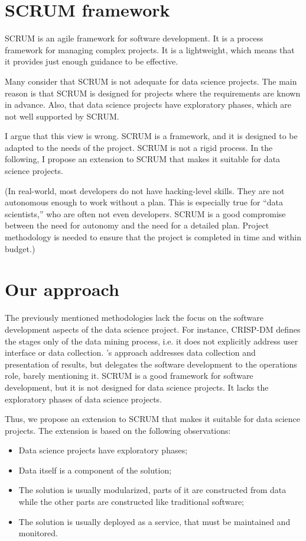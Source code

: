 \section{SCRUM framework}

SCRUM is an agile framework for software development.  It is a process framework for
managing complex projects.  It is a lightweight, which means that it
provides just enough guidance to be effective.

Many consider that SCRUM is not adequate for data science projects.  The main reason is
that SCRUM is designed for projects where the requirements are known in advance.  Also,
that data science projects have exploratory phases, which are not well supported by SCRUM.

I argue that this view is wrong.  SCRUM is a framework, and it is designed to be adapted to
the needs of the project.  SCRUM is not a rigid process.  In the following, I propose an
extension to SCRUM that makes it suitable for data science projects.

(In real-world, most developers do not have hacking-level skills.  They are not autonomous
enough to work without a plan.  This is especially true for ``data scientists,'' who are
often not even developers.  SCRUM is a good compromise between the need for autonomy and
the need for a detailed plan.  Project methodology is needed to ensure that the project is
completed in time and within budget.)

\section{Our approach}

The previously mentioned methodologies lack the focus on the software development aspects of
the data science project.  For instance, CRISP-DM defines the stages only of the data
mining process, i.e. it does not explicitly address user interface or data collection.
\citeauthor{Zumel2019}'s approach addresses data collection and presentation of results, but
delegates the software development to the operations role, barely mentioning it.  SCRUM is
a good framework for software development, but it is not designed for data science
projects.  It lacks the exploratory phases of data science projects.

Thus, we propose an extension to SCRUM that makes it suitable for data science projects.
The extension is based on the following observations:
\begin{itemize}
  \item Data science projects have exploratory phases;
  \item Data itself is a component of the solution;
  \item The solution is usually modularized, parts of it are constructed from data while the
    other parts are constructed like traditional software;
  \item The solution is usually deployed as a service, that must be maintained and
    monitored.
\end{itemize}

